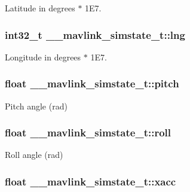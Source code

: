 Latitude in degrees $\ast$ 1\+E7. 

\hypertarget{struct____mavlink__simstate__t_a361b69e992a0ed42517e6d49c9b81912}{
\subsubsection[{lng}]{\setlength{\rightskip}{0pt plus 5cm}int32\+\_\+t \+\_\+\+\_\+mavlink\+\_\+simstate\+\_\+t\+::lng}}\label{struct____mavlink__simstate__t_a361b69e992a0ed42517e6d49c9b81912}


Longitude in degrees $\ast$ 1\+E7. 

\hypertarget{struct____mavlink__simstate__t_a2b568e238360093b42df20978aa33866}{
\subsubsection[{pitch}]{\setlength{\rightskip}{0pt plus 5cm}float \+\_\+\+\_\+mavlink\+\_\+simstate\+\_\+t\+::pitch}}\label{struct____mavlink__simstate__t_a2b568e238360093b42df20978aa33866}


Pitch angle (rad) 

\hypertarget{struct____mavlink__simstate__t_a15c6e07652d29ee12e7c106060c3d399}{
\subsubsection[{roll}]{\setlength{\rightskip}{0pt plus 5cm}float \+\_\+\+\_\+mavlink\+\_\+simstate\+\_\+t\+::roll}}\label{struct____mavlink__simstate__t_a15c6e07652d29ee12e7c106060c3d399}


Roll angle (rad) 

\hypertarget{struct____mavlink__simstate__t_a1730db2e2e70ce64459215f371180f64}{
\subsubsection[{xacc}]{\setlength{\rightskip}{0pt plus 5cm}float \+\_\+\+\_\+mavlink\+\_\+simstate\+\_\+t\+::xacc}}\label{struct____mavlink__simstate__t_a1730db2e2e70ce64459215f371180f64}


